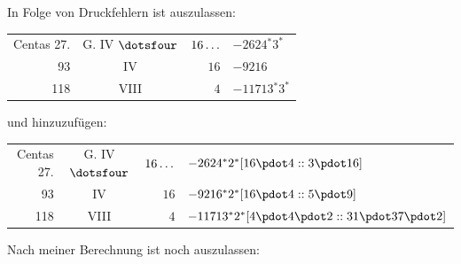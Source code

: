 \par{}In Folge von Druckfehlern ist auszulassen:
\begin{longtable}{rcrl}
Centas 27. & G. IV $\dotsfour$ & $16\mathinner{.\,.\,.}$ & $-2624{}^{*}3^{*}$ \\
93 & IV & $16$ & $-9216$ \\
118 & VIII & $4$ & $-11713{}^{*}3^{*}$ \\
\end{longtable}
\par{}und hinzuzufügen:
\begin{longtable}{rcrl}
Centas 27. & G. IV $\dotsfour$ & $16\mathinner{.\,.\,.}$ & $-2624{}^{*}2^{*}[16\pdot4::3\pdot16]$ \\
93 & IV & $16$ & $-9216{}^{*}2^{*}[16\pdot4::5\pdot9]$ \\
118 & VIII & $4$ & $-11713{}^{*}2^{*}[4\pdot4\pdot2::31\pdot37\pdot2]$ \\
\end{longtable}
\par{}Nach meiner Berechnung ist noch auszulassen:
